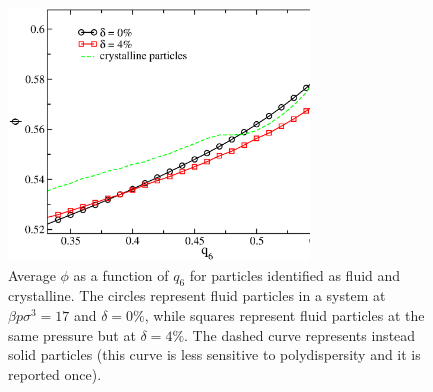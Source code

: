 \documentclass[twocolumn,superscriptaddress]{revtex4-1}
\begin{document}
\begin{figure}
 \centering
 \includegraphics[width=8cm]{./figures/stability_map.eps}
 \caption{Average $\phi$ as a function of $q_6$ for particles identified as fluid and crystalline.
The circles represent fluid particles in a system at $\beta p\sigma^3=17$ and $\delta=0\%$, while
squares represent fluid particles at the same pressure but at $\delta=4\%$. The dashed curve represents
instead solid particles (this curve is less sensitive to polydispersity and it is reported once).}
 \label{fig:stability_map}
\end{figure}




\end{document}
